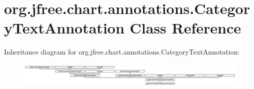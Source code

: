 \hypertarget{classorg_1_1jfree_1_1chart_1_1annotations_1_1_category_text_annotation}{}\section{org.\+jfree.\+chart.\+annotations.\+Category\+Text\+Annotation Class Reference}
\label{classorg_1_1jfree_1_1chart_1_1annotations_1_1_category_text_annotation}
Inheritance diagram for org.\+jfree.\+chart.\+annotations.\+Category\+Text\+Annotation\+:\begin{figure}[H]
\begin{center}
\leavevmode
\includegraphics[height=1.226994cm]{classorg_1_1jfree_1_1chart_1_1annotations_1_1_category_text_annotation}
\end{center}
\end{figure}
